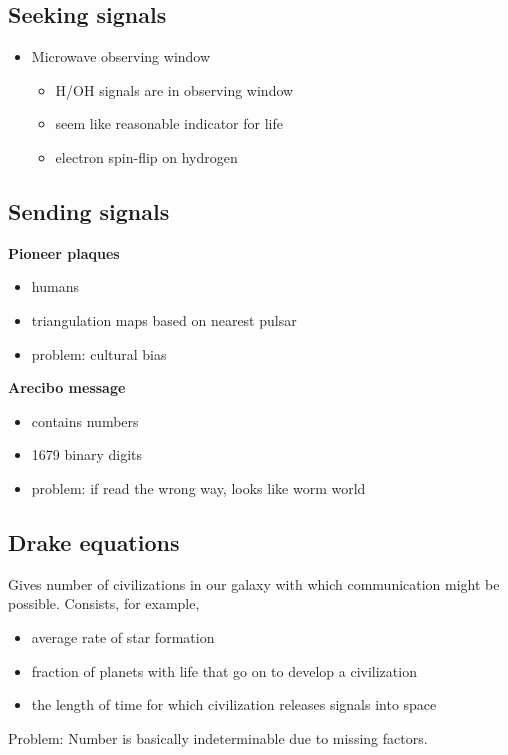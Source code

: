 \documentclass{article}
\theoremstyle{sltheorem}
\begin{document}
\subsection{Seeking signals}
\begin{itemize}
	\item Microwave observing window
	      \begin{itemize}
		      \item H/OH signals are in observing window
		      \item seem like reasonable indicator for life
		      \item electron spin-flip on hydrogen
	      \end{itemize}
\end{itemize}
\subsection{Sending signals}
\textbf{Pioneer plaques}
\begin{itemize}
	\item humans
	\item triangulation maps based on nearest pulsar
	\item problem: cultural bias
\end{itemize}
\textbf{Arecibo message}
\begin{itemize}
	\item contains numbers
	\item 1679 binary digits
	\item problem: if read the wrong way, looks like worm world
\end{itemize}
\subsection{Drake equations}
Gives number of civilizations in our galaxy with which communication might be possible.
Consists, for example,
\begin{itemize}
	\item average rate of star formation
	\item fraction of planets with life that go on to develop a civilization
	\item the length of time for which civilization releases signals into space
\end{itemize}
Problem: Number is basically indeterminable due to missing factors.
\end{document}
